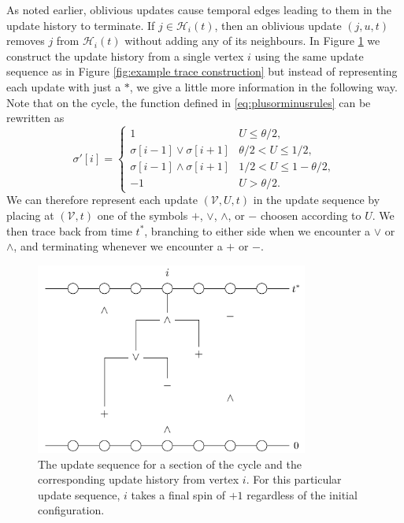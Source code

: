 	As noted earlier, oblivious updates cause temporal edges leading to them in the update history to terminate. If $j \in \mathcal{H}_i(t)$, then an oblivious update $(j, u, t)$ removes $j$ from $\mathcal{H}_i(t)$ without adding any of its neighbours. In Figure \ref{fig:example percolation construction oblivious} we construct the update history from a single vertex $i$ using the same update sequence as in Figure \ref{fig:example trace construction} but instead of representing each update with just a $*$, we give a little more information in the following way. Note that on the cycle, the function defined in \eqref{eq:plusorminusrules} can be rewritten as
	\begin{equation}
		\sigma'[i] = 
		\begin{cases}
			1 & U \leq \theta/2,\\
			\sigma[i-1] \vee \sigma[i+1] & \theta/2 < U \leq 1/2,\\
			\sigma[i-1] \wedge \sigma[i+1] & 1/2 < U \leq 1 - \theta/2,\\
			-1	& U > \theta/2.
		\end{cases}
	\end{equation}
	We can therefore represent each update $(\mathcal{V}, U, t)$ in the update sequence by placing at $(\mathcal{V}, t)$ one of the symbols $+$, $\vee$, $\wedge$, or $-$ choosen according to $U$. We then trace back from time $t^*$, branching to either side when we encounter a $\vee$ or $\wedge$, and terminating whenever we encounter a $+$ or $-$.

	\begin{figure}
		\centering
		\includegraphics[width = 0.8\textwidth]{Figures/IsingCouplingTime/example_percolation_construction_oblivious.pdf}
		\caption[The update sequence for a section of the cycle and the corresponding update history from vertex i]{The update sequence for a section of the cycle and the corresponding update history from vertex $i$. For this particular update sequence, $i$ takes a final spin of $+1$ regardless of the initial configuration.}
		\label{fig:example percolation construction oblivious}
	\end{figure}

